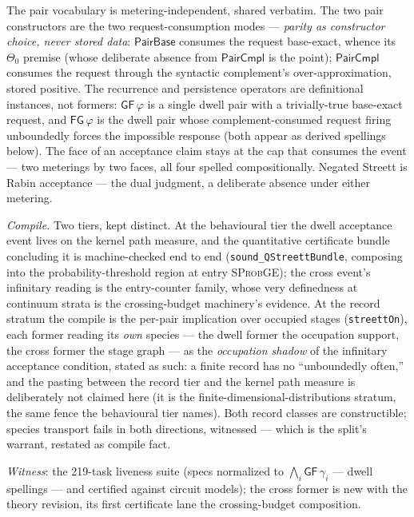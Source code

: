 The pair vocabulary is metering-independent, shared verbatim. The
two pair constructors are the two request-consumption modes ---
\emph{parity as constructor choice, never stored data}:
$\mathsf{PairBase}$
consumes the request base-exact, whence its $\Theta_0$ premise
(whose deliberate absence from $\mathsf{PairCmpl}$ is the point);
$\mathsf{PairCmpl}$ consumes the request through the syntactic
complement's over-approximation, stored positive. The recurrence and
persistence operators are definitional instances, not formers:
$\mathsf{GF}\,\varphi$ is a single dwell pair with a trivially-true
base-exact request, and $\mathsf{FG}\,\varphi$ is the dwell pair
whose complement-consumed request firing unboundedly forces the
impossible response (both appear as derived spellings below). The
face of an acceptance claim stays at the cap that consumes the
event --- two meterings by two faces, all four spelled
compositionally. Negated Streett is Rabin acceptance --- the dual
judgment, a deliberate absence under either metering.

\emph{Compile.} Two tiers, kept distinct. At the behavioural
tier the dwell acceptance event lives on the kernel path measure,
and the quantitative certificate bundle concluding it is
machine-checked end to end (\texttt{sound\_QStreettBundle},
composing into the probability-threshold region at entry
\textsc{SProbGE}); the cross event's infinitary reading is the
entry-counter family, whose very definedness at continuum strata is
the crossing-budget machinery's evidence. At the record
stratum the compile is the per-pair implication over occupied
stages (\texttt{streettOn}), each former reading its \emph{own}
species --- the dwell former the occupation support, the cross
former the stage graph --- as the \emph{occupation shadow} of the
infinitary acceptance condition, stated as such: a finite record has
no ``unboundedly often,'' and the pasting between the record tier
and the kernel path measure is deliberately not claimed here (it is
the finite-dimensional-distributions stratum, the same fence the
behavioural tier names). Both record classes are constructible;
species transport fails in both directions, witnessed --- which is
the split's warrant, restated as compile fact.

\emph{Witness}: the 219-task liveness suite (specs normalized to
$\bigwedge_i \mathsf{GF}\,\gamma_i$ --- dwell spellings --- and
certified against circuit models); the cross former is new with the
theory revision, its first certificate lane the crossing-budget
composition.

